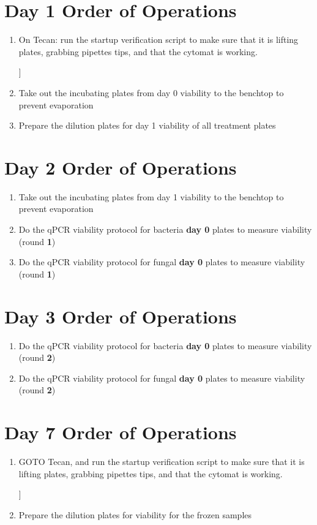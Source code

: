 \documentclass{article}
\newcounter{comments}
\newcommand{\amogh}[1]{{\addtocounter{comments}{1}}{\color{red}{[\textbf{TODO Amogh \thecomments :}\ #1}]}}
\begin{document}
\section*{Day 1 Order of Operations} \label{day1instructions}
\begin{enumerate}
    \item On Tecan: run the startup verification script to make sure that it is lifting plates, grabbing pipettes tips, and that the cytomat is working. \amogh{}
    \item Take out the incubating plates from day 0 viability to the benchtop to prevent evaporation
    \item Prepare the dilution plates for day 1 viability of all treatment plates
\end{enumerate}

\section*{Day 2 Order of Operations} \label{day1instructions}
\begin{enumerate}
    \item Take out the incubating plates from day 1 viability to the benchtop to prevent evaporation
    \item Do the qPCR viability protocol for bacteria \textbf{day 0} plates to measure viability (round \textbf{1})
    \item Do the qPCR viability protocol for fungal \textbf{day 0} plates to measure viability (round \textbf{1})
\end{enumerate}

\section*{Day 3 Order of Operations} \label{day1instructions}
\begin{enumerate}
    \item Do the qPCR viability protocol for bacteria \textbf{day 0} plates to measure viability (round \textbf{2})
    \item Do the qPCR viability protocol for fungal \textbf{day 0} plates to measure viability (round \textbf{2})
\end{enumerate}

\section*{Day 7 Order of Operations} \label{day7instructions}
\begin{enumerate}
    \item GOTO Tecan, and run the startup verification script to make sure that it is lifting plates, grabbing pipettes tips, and that the cytomat is working. \amogh{}
    \item Prepare the dilution plates for viability for the frozen samples
\end{enumerate}
\end{document}
